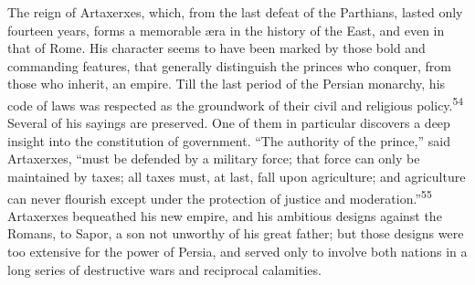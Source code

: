 


The reign of Artaxerxes, which, from the last defeat of the
Parthians, lasted only fourteen years, forms a memorable æra in
the history of the East, and even in that of Rome. His character
seems to have been marked by those bold and commanding features,
that generally distinguish the princes who conquer, from those
who inherit, an empire. Till the last period of the Persian
monarchy, his code of laws was respected as the groundwork of
their civil and religious policy.\textsuperscript{54} Several of his sayings are
preserved. One of them in particular discovers a deep insight
into the constitution of government. “The authority of the
prince,” said Artaxerxes, “must be defended by a military force;
that force can only be maintained by taxes; all taxes must, at
last, fall upon agriculture; and agriculture can never flourish
except under the protection of justice and moderation.”\textsuperscript{55}
Artaxerxes bequeathed his new empire, and his ambitious designs
against the Romans, to Sapor, a son not unworthy of his great
father; but those designs were too extensive for the power of
Persia, and served only to involve both nations in a long series
of destructive wars and reciprocal calamities.




